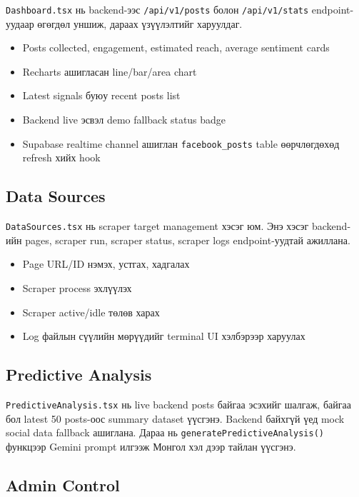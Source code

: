 \documentclass[
12pt,
oneside,
english,
onehalfspacing,
nolistspacing,
headsepline,
]{MUST-Thesis}
\begin{document}
\texttt{Dashboard.tsx} нь backend-ээс \texttt{/api/v1/posts} болон \texttt{/api/v1/stats} endpoint-уудаар өгөгдөл уншиж, дараах үзүүлэлтийг харуулдаг.

\begin{itemize}
    \item Posts collected, engagement, estimated reach, average sentiment cards
    \item Recharts ашигласан line/bar/area chart
    \item Latest signals буюу recent posts list
    \item Backend live эсвэл demo fallback status badge
    \item Supabase realtime channel ашиглан \texttt{facebook\_posts} table өөрчлөгдөхөд refresh хийх hook
\end{itemize}

\subsection{Data Sources}

\texttt{DataSources.tsx} нь scraper target management хэсэг юм. Энэ хэсэг backend-ийн pages, scraper run, scraper status, scraper logs endpoint-уудтай ажиллана.

\begin{itemize}
    \item Page URL/ID нэмэх, устгах, хадгалах
    \item Scraper process эхлүүлэх
    \item Scraper active/idle төлөв харах
    \item Log файлын сүүлийн мөрүүдийг terminal UI хэлбэрээр харуулах
\end{itemize}

\subsection{Predictive Analysis}

\texttt{PredictiveAnalysis.tsx} нь live backend posts байгаа эсэхийг шалгаж, байгаа бол latest 50 posts-оос summary dataset үүсгэнэ. Backend байхгүй үед mock social data fallback ашиглана. Дараа нь \texttt{generatePredictiveAnalysis()} функцээр Gemini prompt илгээж Монгол хэл дээр тайлан үүсгэнэ.

\subsection{Admin Control}
\end{document}
